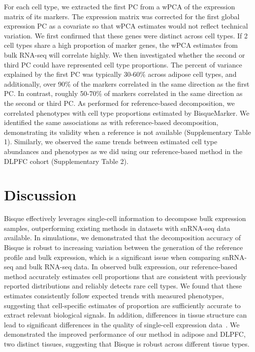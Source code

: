 For each cell type, we extracted the first PC from a wPCA of the expression matrix of its markers. The expression matrix was corrected for the first global expression PC as a covariate so that wPCA estimates would not reflect technical variation. We first confirmed that these genes were distinct across cell types. If 2 cell types share a high proportion of marker genes, the wPCA estimates from bulk RNA-seq will correlate highly. We then investigated whether the second or third PC could have represented cell type proportions. The percent of variance explained by the first PC was typically 30-60\% across adipose cell types, and additionally, over 90\% of the markers correlated in the same direction as the first PC. In contrast, roughly 50-70\% of markers correlated in the same direction as the second or third PC. As performed for reference-based decomposition, we correlated phenotypes with cell type proportions estimated by BisqueMarker. We identified the same associations as with reference-based decomposition, demonstrating its validity when a reference is not available (Supplementary Table 1). Similarly, we observed the same trends between estimated cell type abundances and phenotypes as we did using our reference-based method in the DLPFC cohort (Supplementary Table 2). 

\section{Discussion}

Bisque effectively leverages single-cell information to decompose bulk expression samples, outperforming existing methods in datasets with snRNA-seq data available. In simulations, we demonstrated that the decomposition accuracy of Bisque is robust to increasing variation between the generation of the reference profile and bulk expression, which is a significant issue when comparing snRNA-seq and bulk RNA-seq data. In observed bulk expression, our reference-based method accurately estimates cell proportions that are consistent with previously reported distributions and reliably detects rare cell types. We found that these estimates consistently follow expected trends with measured phenotypes, suggesting that cell-specific estimates of proportion are sufficiently accurate to extract relevant biological signals. In addition, differences in tissue structure can lead to significant differences in the quality of single-cell expression data~\cite{Nguyen2018-gv}. We demonstrated the improved performance of our method in adipose and DLPFC, two distinct tissues, suggesting that Bisque is robust across different tissue types.

